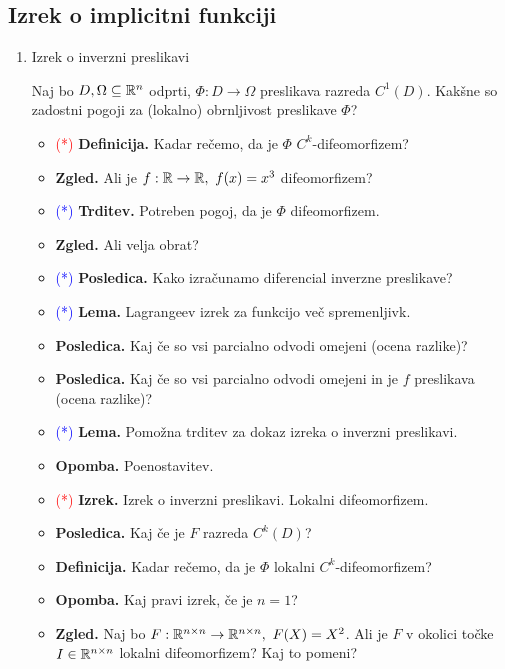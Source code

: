 \subsection{Izrek o implicitni funkciji}
\begin{enumerate}
    \item Izrek o inverzni preslikavi
    
    Naj bo $D, \Omega \subseteq \mathbb{R}^n$ odprti, $\Phi: D \to \Omega$ preslikava razreda $C^1(D)$. Kakšne so zadostni pogoji za (lokalno) obrnljivost preslikave $\Phi$?
    
    \begin{itemize}
        \item \textcolor{red}{(*)} \textbf{Definicija.} Kadar rečemo, da je $\Phi$ $C^k$-difeomorfizem?
        \item \textbf{Zgled.} Ali je $f: \mathbb{R} \to \mathbb{R}, \ f(x) = x^3$ difeomorfizem?        
        \item \textcolor{blue}{(*)} \textbf{Trditev.} Potreben pogoj, da je $\Phi$ difeomorfizem.
        \item \textbf{Zgled.} Ali velja obrat? 
        \item \textcolor{blue}{(*)} \textbf{Posledica.} Kako izračunamo diferencial inverzne preslikave?
        \item \textcolor{blue}{(*)} \textbf{Lema.} Lagrangeev izrek za funkcijo več spremenljivk.
        \item \textbf{Posledica.} Kaj če so vsi parcialno odvodi omejeni (ocena razlike)?
        \item \textbf{Posledica.} Kaj če so vsi parcialno odvodi omejeni in je \(f\) preslikava (ocena razlike)?
        \item \textcolor{blue}{(*)} \textbf{Lema.} Pomožna trditev za dokaz izreka o inverzni preslikavi.
        \item \textbf{Opomba.} Poenostavitev.
        \item \textcolor{red}{(*)} \textbf{Izrek.} Izrek o inverzni preslikavi. Lokalni difeomorfizem.
        \item \textbf{Posledica.} Kaj če je $F$ razreda $C^k(D)$?
        \item \textbf{Definicija.} Kadar rečemo, da je $\Phi$ lokalni $C^k$-difeomorfizem?
        \item \textbf{Opomba.} Kaj pravi izrek, če je $n = 1$?
        \item \textbf{Zgled.}  Naj bo $F: \mathbb{R}^{n \times n} \to \mathbb{R}^{n \times n}, \ F(X) = X^2$. Ali je $F$ v okolici točke $I \in \mathbb{R}^{n \times n}$ lokalni difeomorfizem? Kaj to pomeni?
    \end{itemize}
    


\end{enumerate}
